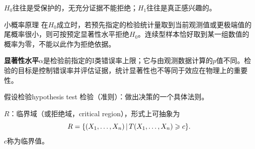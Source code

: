 $H_0$往往是受保护的，无充分证据不能拒绝；$H_1$往往是真正感兴趣的。
\begin{theorem}{小概率原理}{}
	在$H_0$成立时，若预先指定的检验统计量取到当前观测值或更极端值的尾概率很小，则可按预定显著性水平拒绝$H_0$。连续型样本恰好取到某一组数值的概率为零，不能以此作为拒绝依据。
\end{theorem}
\textbf{显著性水平}$\alpha$是检验前指定的I类错误率上限；它与由观测数据计算的$p$值不同。检验的目标是控制错误率并评估证据，统计显著性也不等同于效应在物理上的重要性。
\begin{definition}{假设检验}{hypothesis test}
	检验（准则）：做出决策的一个具体法则。

	$R$：临界域（或拒绝域，critical region），形式上可抽象为
	\begin{equation}\label{eq:ps-rejection-region}
		R = \{(X_1,\ldots,X_n)\,\vert\,T(X_1,\ldots,X_n) \geqslant c\}.
	\end{equation}
	$c$称为临界值。
\end{definition}

